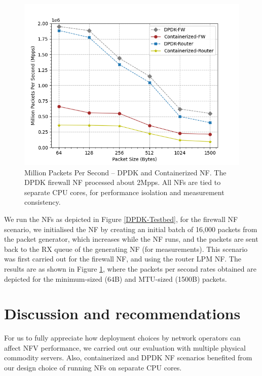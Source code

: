 \documentclass[conference]{IEEEtran}
\begin{document}
\begin{figure}[ht]
\centering
\includegraphics[width=0.9\columnwidth]{ContainerDPDK.png}
\caption{Million Packets Per Second -- DPDK and Containerized NF. The DPDK firewall NF processed about 2Mpps. All NFs are tied to separate CPU cores, for performance isolation and measurement consistency.}
\label{ContainerDPDK}
\end{figure}

We run the NFs as depicted in Figure \ref{DPDK-Testbed}, for the firewall NF scenario, we initialised the NF by creating an initial batch of 16,000 packets from the packet generator, which increases while the NF runs, and the packets are sent back to the RX queue of the generating NF (for measurements). This scenario was first carried out for the firewall NF, and using the router LPM NF. The results are as shown in Figure \ref{ContainerDPDK}, where the packets per second rates obtained are depicted for the minimum-sized (64B) and MTU-sized (1500B) packets.

\section{Discussion and recommendations}
\label{Discussion}
For us to fully appreciate how deployment choices by network operators can affect NFV performance, we carried out our evaluation with multiple physical commodity servers. Also, containerized and DPDK NF scenarios benefited from our design choice of running NFs on separate CPU cores.   
\end{document}

